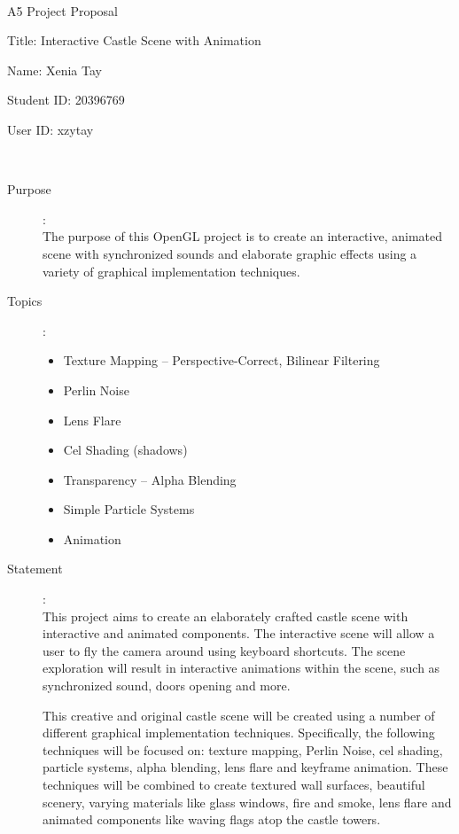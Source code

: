 \documentclass {article}
\begin{document}
~\vfill
\begin{center}
\Large

A5 Project Proposal

Title: Interactive Castle Scene with Animation

Name: Xenia Tay

Student ID: 20396769

User ID: xzytay
\end{center}
\vfill ~\vfill~
\newpage
{}
\begin{description}
\item[Purpose]:\\
    The purpose of this OpenGL project is to create an interactive, animated scene with synchronized sounds and elaborate graphic effects using a variety of graphical implementation techniques.

\item[Topics]:
\begin{itemize}
    \item Texture Mapping -- Perspective-Correct, Bilinear Filtering
    \item Perlin Noise
    \item Lens Flare
    \item Cel Shading (shadows)
    \item Transparency -- Alpha Blending
    \item Simple Particle Systems
    \item Animation
\end{itemize}

\item[Statement]:\\
    This project aims to create an elaborately crafted castle scene with interactive and animated components. The interactive scene will allow a user to fly the camera around using keyboard shortcuts. The scene exploration will result in interactive animations within the scene, such as synchronized sound, doors opening and more.

    This creative and original castle scene will be created using a number of different graphical implementation techniques. Specifically, the following techniques will be focused on: texture mapping, Perlin Noise, cel shading, particle systems, alpha blending, lens flare and keyframe animation. These techniques will be combined to create textured wall surfaces, beautiful scenery, varying materials like glass windows, fire and smoke, lens flare and animated components like waving flags atop the castle towers.


\end{description}
\end{document}
